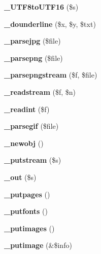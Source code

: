 \begin{DoxyCompactItemize}
\item 
{\bfseries \+\_\+\+U\+T\+F8to\+U\+T\+F16} (\$s)\label{class_f_p_d_f_af7fe4a30d0b766ecff3f184b083f47c0}

\item 
{\bfseries \+\_\+dounderline} (\$x, \$y, \$txt)\label{class_f_p_d_f_a4139800347bfdf7c395bd24443989c2f}

\item 
{\bfseries \+\_\+parsejpg} (\$file)\label{class_f_p_d_f_a2f1e290b0979e2310b84bab675019964}

\item 
{\bfseries \+\_\+parsepng} (\$file)\label{class_f_p_d_f_ac55d7bc74245176354b9a50d105dd599}

\item 
{\bfseries \+\_\+parsepngstream} (\$f, \$file)\label{class_f_p_d_f_a3ecb2fb2e1fc47ada32f3edb442d48e3}

\item 
{\bfseries \+\_\+readstream} (\$f, \$n)\label{class_f_p_d_f_acc3b07da9666a1b944ae2a825e9d5c88}

\item 
{\bfseries \+\_\+readint} (\$f)\label{class_f_p_d_f_a2f553e9f61d7b62dae88552413773b48}

\item 
{\bfseries \+\_\+parsegif} (\$file)\label{class_f_p_d_f_ab61d60e644203796aba87729558fad2f}

\item 
{\bfseries \+\_\+newobj} ()\label{class_f_p_d_f_a6779d67dae49accb4cf7ab5847b11e81}

\item 
{\bfseries \+\_\+putstream} (\$s)\label{class_f_p_d_f_a6990e1ae9657cc9e0d408dc42bea62f5}

\item 
{\bfseries \+\_\+out} (\$s)\label{class_f_p_d_f_a01627a8b7ad5c79ee736572b3d2ef3f5}

\item 
{\bfseries \+\_\+putpages} ()\label{class_f_p_d_f_a759f3c1bfed43a783e073ce9f9b9caff}

\item 
{\bfseries \+\_\+putfonts} ()\label{class_f_p_d_f_a4ae04c17a87a0d5bdd0c366a08490389}

\item 
{\bfseries \+\_\+putimages} ()\label{class_f_p_d_f_a8373f5b9e6f6f9878fa71c4344fea6e7}

\item 
{\bfseries \+\_\+putimage} (\&\$info)\label{class_f_p_d_f_aa1f0ef0466346805f2a90088a630698b}


\end{DoxyCompactItemize}
